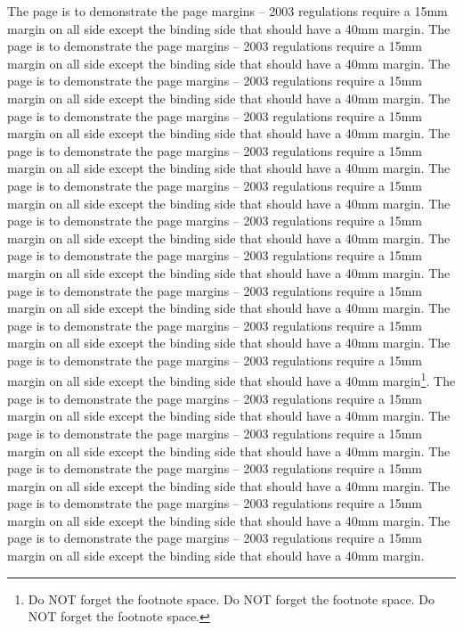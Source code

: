 \documentclass[12pt,MSc,twoside]{muthesis}
\begin{document}
The page is to demonstrate the page margins -- 2003 regulations
require a 15mm margin on all side except the binding side that
should have a 40mm margin. The page is to demonstrate the page
margins -- 2003 regulations require a 15mm margin on all side
except the binding side that should have a 40mm margin. The page
is to demonstrate the page margins -- 2003 regulations require a
15mm margin on all side except the binding side that should have a
40mm margin. The page is to demonstrate the page margins -- 2003
regulations require a 15mm margin on all side except the binding
side that should have a 40mm margin. The page is to demonstrate
the page margins -- 2003 regulations require a 15mm margin on all
side except the binding side that should have a 40mm margin. The
page is to demonstrate the page margins -- 2003 regulations
require a 15mm margin on all side except the binding side that
should have a 40mm margin. The page is to demonstrate the page
margins -- 2003 regulations require a 15mm margin on all side
except the binding side that should have a 40mm margin. The page
is to demonstrate the page margins -- 2003 regulations require a
15mm margin on all side except the binding side that should have a
40mm margin. The page is to demonstrate the page margins -- 2003
regulations require a 15mm margin on all side except the binding
side that should have a 40mm margin. The page is to demonstrate
the page margins -- 2003 regulations require a 15mm margin on all
side except the binding side that should have a 40mm margin. The
page is to demonstrate the page margins -- 2003 regulations
require a 15mm margin on all side except the binding side that
should have a 40mm margin\footnote{Do NOT forget the footnote
space. Do NOT forget the footnote space. Do NOT forget the footnote
space.}. The page is to demonstrate the page margins -- 2003
regulations require a 15mm margin on all side except the binding
side that should have a 40mm margin. The page is to demonstrate the
page margins -- 2003 regulations require a 15mm margin on all side
except the binding side that should have a 40mm margin. The page is
to demonstrate the page margins -- 2003 regulations require a 15mm
margin on all side except the binding side that should have a 40mm
margin. The page is to demonstrate the page margins -- 2003
regulations require a 15mm margin on all side except the binding
side that should have a 40mm margin. The page is to demonstrate the
page margins -- 2003 regulations require a 15mm margin on all side
except the binding side that should have a 40mm margin.
\end{document}
